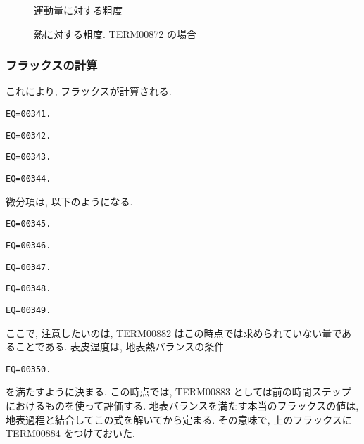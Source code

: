 \begin{figure}[htbp]
  \begin{center}
    \caption{運動量に対する粗度}
    \label{p-sflx:cm}
  \end{center}
\end{figure}
\begin{figure}[htbp]
  \begin{center}
    \caption{熱に対する粗度. TERM00872 の場合}
    \label{p-sflx:ch}
  \end{center}
\end{figure}

\subsubsection{フラックスの計算}

これにより, フラックスが計算される.
%
\begin{verbatim}
EQ=00341.
\end{verbatim}
\begin{verbatim}
EQ=00342.
\end{verbatim}
\begin{verbatim}
EQ=00343.
\end{verbatim}
\begin{verbatim}
EQ=00344.
\end{verbatim}

微分項は, 以下のようになる.
\begin{verbatim}
EQ=00345.
\end{verbatim}
\begin{verbatim}
EQ=00346.
\end{verbatim}
\begin{verbatim}
EQ=00347.
\end{verbatim}
\begin{verbatim}
EQ=00348.
\end{verbatim}
\begin{verbatim}
EQ=00349.
\end{verbatim}

ここで, 注意したいのは,
TERM00882 はこの時点では求められていない量であることである.
表皮温度は, 
地表熱バランスの条件
\begin{verbatim}
EQ=00350.
\end{verbatim}
を満たすように決まる.
この時点では, TERM00883 としては前の時間ステップにおけるものを使って評価する.
地表バランスを満たす本当のフラックスの値は,
地表過程と結合してこの式を解いてから定まる.
その意味で, 上のフラックスに TERM00884 をつけておいた.

